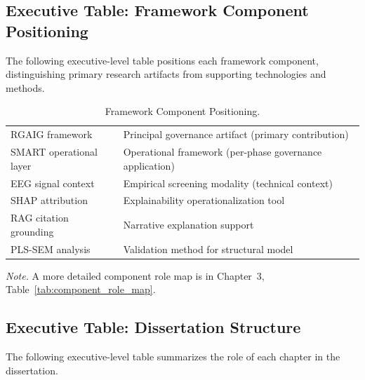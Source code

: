 \subsection{Executive Table: Framework Component Positioning}
\label{sec:exec_framework_positioning}

\noindent The following executive-level table positions each framework component, distinguishing primary research artifacts from supporting technologies and methods.

{\tablestripes\tablefontsize
{}
\begin{xltabular}{\textwidth}{@{} >{\raggedright\arraybackslash}p{6cm} L @{}}
\caption[Framework Component Positioning]{Framework Component Positioning.}\label{tab:exec_framework_positioning} \\
\toprule
{} &  \\
\midrule
\endfirsthead
\endhead
\bottomrule
\endlastfoot
RGAIG framework & Principal governance artifact (primary contribution) \\
\addlinespace
SMART operational layer & Operational framework (per-phase governance application) \\
\addlinespace
EEG signal context & Empirical screening modality (technical context) \\
\addlinespace
SHAP attribution & Explainability operationalization tool \\
\addlinespace
RAG citation grounding & Narrative explanation support \\
\addlinespace
PLS-SEM analysis & Validation method for structural model \\
\end{xltabular}}
\vspace{0.3em}\noindent\textit{Note.} A more detailed component role map is in Chapter~3, Table~\ref{tab:component_role_map}.


\subsection{Executive Table: Dissertation Structure}
\label{sec:exec_dissertation_structure}

\noindent The following executive-level table summarizes the role of each chapter in the dissertation.

